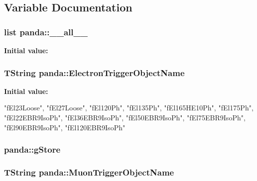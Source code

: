 \subsection{Variable Documentation}
\hypertarget{namespacepanda_a07bcd2dd27ad63919a99b0f40d4a3883}{
\subsubsection[{\_\-\_\-all\_\-\_\-}]{\setlength{\rightskip}{0pt plus 5cm}list {\bf panda::\_\-\_\-all\_\-\_\-}}}
\label{namespacepanda_a07bcd2dd27ad63919a99b0f40d4a3883}
{\bfseries Initial value:}
\begin{DoxyCode}
\end{DoxyCode}
\hypertarget{namespacepanda_a02d6deff9694c424ea17b18841c10c99}{
\subsubsection[{ElectronTriggerObjectName}]{\setlength{\rightskip}{0pt plus 5cm}TString {\bf panda::ElectronTriggerObjectName}}}
\label{namespacepanda_a02d6deff9694c424ea17b18841c10c99}
{\bfseries Initial value:}
\begin{DoxyCode}
 {
  "fEl23Loose",
  "fEl27Loose",
  "fEl120Ph",
  "fEl135Ph",
  "fEl165HE10Ph",
  "fEl175Ph",
  "fEl22EBR9IsoPh",
  "fEl36EBR9IsoPh",
  "fEl50EBR9IsoPh",
  "fEl75EBR9IsoPh",
  "fEl90EBR9IsoPh",
  "fEl120EBR9IsoPh"
}
\end{DoxyCode}
\hypertarget{namespacepanda_a9502e581e4143e9eb5b26249625f8fe4}{
\subsubsection[{gStore}]{ {\bf panda::gStore}}}
\label{namespacepanda_a9502e581e4143e9eb5b26249625f8fe4}
\hypertarget{namespacepanda_ab0aef64e5845b73e1072a7ed38cfd5c2}{
\subsubsection[{MuonTriggerObjectName}]{\setlength{\rightskip}{0pt plus 5cm}TString {\bf panda::MuonTriggerObjectName}}}
